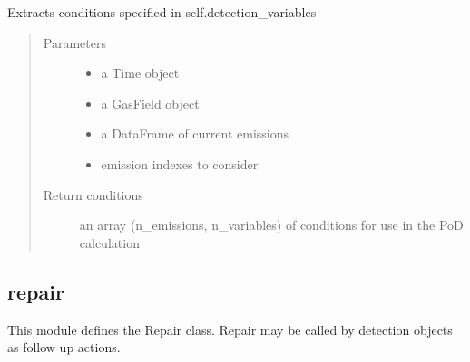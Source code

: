 \documentclass[letterpaper,10pt,english]{sphinxmanual}
\begin{document}
\begin{fulllineitems}
\begin{fulllineitems}
\label{\detokenize{index:feast.DetectionModules.abstract_detection_method.DetectionMethod.get_current_conditions}}
Extracts conditions specified in self.detection\_variables
\begin{quote}\begin{description}
\item[{Parameters}] \leavevmode\begin{itemize}
\item {} 
 \textendash{} a Time object

\item {} 
 \textendash{} a GasField object

\item {} 
 \textendash{} a DataFrame of current emissions

\item {} 
 \textendash{} emission indexes to consider

\end{itemize}

\item[{Return conditions}] \leavevmode
an array (n\_emissions, n\_variables) of conditions for use in the PoD calculation

\end{description}\end{quote}

\end{fulllineitems}


\end{fulllineitems}



\subsection{repair}
\label{\detokenize{index:module-feast.DetectionModules.repair}}\label{\detokenize{index:repair}}
This module defines the Repair class. Repair may be called by detection objects as follow up actions.
\end{document}
